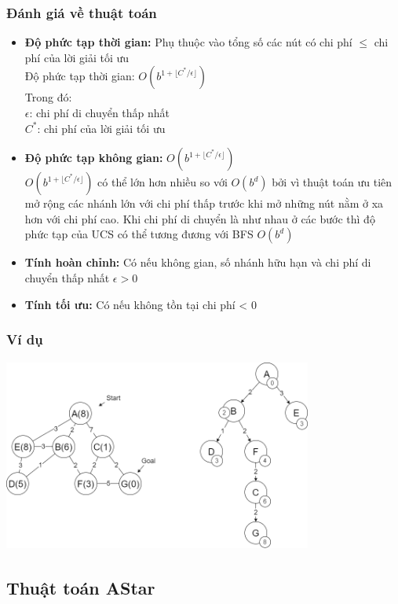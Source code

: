 \documentclass{article}
\begin{document}
\subsubsection{Đánh giá về thuật toán}
\begin{itemize}
    \item \textbf{Độ phức tạp thời gian:} Phụ thuộc vào tổng số các nút có chi phí $\leq$ chi phí của lời giải tối ưu\\
    Độ phức tạp thời gian: $O(b^{1 + \lfloor C^*/\epsilon\rfloor})$\\
    Trong đó:\\
    $\epsilon$: chi phí di chuyển thấp nhất\\
    $C^*$: chi phí của lời giải tối ưu
    \item \textbf{Độ phức tạp không gian:} $O(b^{1 + \lfloor C^*/\epsilon\rfloor})$\\
    $O(b^{1 + \lfloor C^*/\epsilon\rfloor})$ có thể lớn hơn nhiều so với $O(b^d)$ bởi vì thuật toán ưu tiên mở rộng các nhánh lớn với chi phí thấp trước khi mở những nút nằm ở xa hơn với chi phí cao. Khi chi phí di chuyển là như nhau ở các bước thì độ phức tạp của UCS có thể tương đương với BFS $O(b^d)$
    \item \textbf{Tính hoàn chỉnh:} Có nếu không gian, số nhánh hữu hạn và chi phí di chuyển thấp nhất $\epsilon > 0$
    \item \textbf{Tính tối ưu:} Có nếu không tồn tại chi phí < 0
\end{itemize}
\subsubsection{Ví dụ}
    \centerline{\includegraphics[width=4in, height=2.5in]{image/ucs.png}}
    \vspace{2\baselineskip}
\subsection{Thuật toán AStar}
\end{document}
